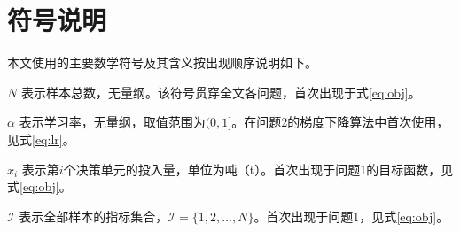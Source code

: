 \section{符号说明}

本文使用的主要数学符号及其含义按出现顺序说明如下。

$N$ 表示样本总数，无量纲。该符号贯穿全文各问题，首次出现于式\cref{eq:obj}。

$\alpha$ 表示学习率，无量纲，取值范围为$(0, 1]$。在问题2的梯度下降算法中首次使用，见式\cref{eq:lr}。

$x_i$ 表示第$i$个决策单元的投入量，单位为吨（t）。首次出现于问题1的目标函数，见式\cref{eq:obj}。

$\mathcal{I}$ 表示全部样本的指标集合，$\mathcal{I} = \{1, 2, \dots, N\}$。首次出现于问题1，见式\cref{eq:obj}。

%
